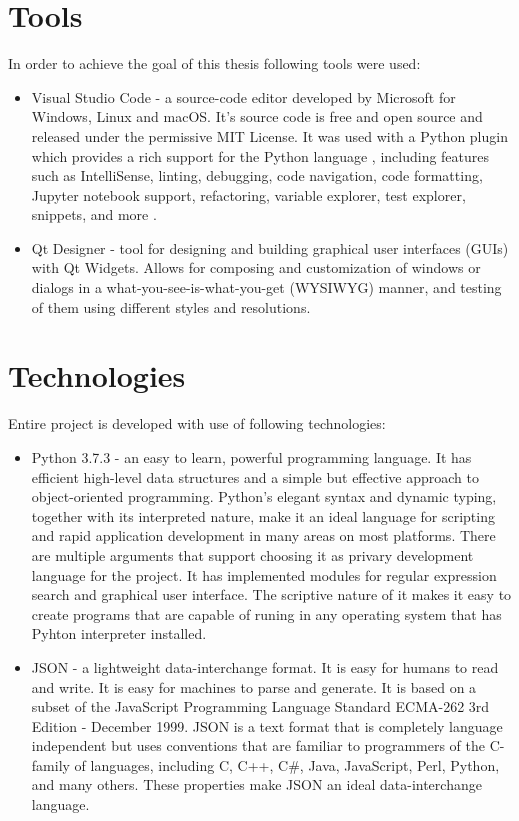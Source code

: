 \documentclass[a4paper,twoside,12pt]{book}
\begin{document}
\section{Tools}
In order to achieve the goal of this thesis following tools were used:
\begin{itemize}
   \item Visual Studio Code - a source-code editor developed by Microsoft for Windows, Linux and macOS. It's source code is free and open source and 
   released under the permissive MIT License. It was used with a Python plugin which provides a rich support for the Python language , including 
   features such as IntelliSense, linting, debugging, code navigation, code formatting, Jupyter notebook support, refactoring, variable explorer, 
   test explorer, snippets, and more \cite{bib:internetVSC}\cite{bib:internetVSCLicence}.
   \item Qt Designer - tool for designing and building graphical user interfaces (GUIs) with Qt Widgets. Allows for composing and customization 
   of windows or dialogs in a what-you-see-is-what-you-get (WYSIWYG) manner, and testing of them using different styles and resolutions\cite{bib:internetQt}.
\end{itemize} 
\section{Technologies}
Entire project is developed with use of following technologies:
\begin{itemize}
   \item Python 3.7.3 - an easy to learn, powerful programming language. It has efficient high-level data structures 
   and a simple but effective approach to object-oriented programming. Python’s elegant syntax and dynamic typing, together with its interpreted nature, make it 
   an ideal language for scripting and rapid application development in many areas on most platforms\cite{bib:bookPython}. There are multiple arguments that support
   choosing it as privary development language for the project. It has implemented modules for regular expression search and graphical user interface.
   The scriptive nature of it makes it easy to create programs that are capable of runing in any operating system that has Pyhton interpreter installed.
   \item JSON - a lightweight data-interchange format. It is easy for humans to read and write. It is easy for machines to parse and generate. It is based on a
   subset of the JavaScript Programming Language Standard ECMA-262 3rd Edition - December 1999. JSON is a text format that is completely language independent but
   uses conventions that are familiar to programmers of the C-family of languages, including C, C++, C\#, Java, JavaScript, Perl, Python, and many others. These
   properties make JSON an ideal data-interchange language\cite{bib:internetJSON}.
\end{itemize}
\end{document}
